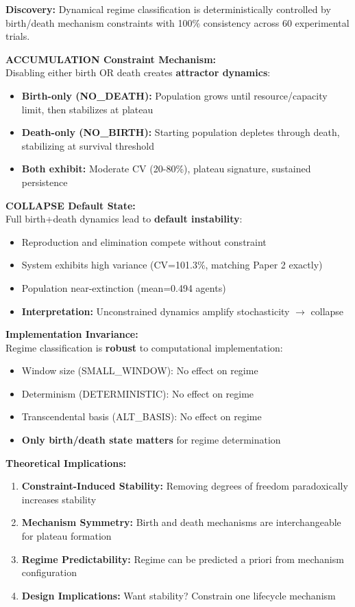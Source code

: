 \documentclass[11pt]{article}
\begin{document}
\textbf{Discovery:} Dynamical regime classification is deterministically controlled by birth/death mechanism constraints with 100\% consistency across 60 experimental trials.

\textbf{ACCUMULATION Constraint Mechanism:}\\
Disabling either birth OR death creates \textbf{attractor dynamics}:
\begin{itemize}
\item \textbf{Birth-only (NO\_DEATH):} Population grows until resource/capacity limit, then stabilizes at plateau
\item \textbf{Death-only (NO\_BIRTH):} Starting population depletes through death, stabilizing at survival threshold
\item \textbf{Both exhibit:} Moderate CV (20-80\%), plateau signature, sustained persistence
\end{itemize}

\textbf{COLLAPSE Default State:}\\
Full birth+death dynamics lead to \textbf{default instability}:
\begin{itemize}
\item Reproduction and elimination compete without constraint
\item System exhibits high variance (CV=101.3\%, matching Paper 2 exactly)
\item Population near-extinction (mean=0.494 agents)
\item \textbf{Interpretation:} Unconstrained dynamics amplify stochasticity $\rightarrow$ collapse
\end{itemize}

\textbf{Implementation Invariance:}\\
Regime classification is \textbf{robust} to computational implementation:
\begin{itemize}
\item Window size (SMALL\_WINDOW): No effect on regime
\item Determinism (DETERMINISTIC): No effect on regime
\item Transcendental basis (ALT\_BASIS): No effect on regime
\item \textbf{Only birth/death state matters} for regime determination
\end{itemize}

\textbf{Theoretical Implications:}
\begin{enumerate}
\item \textbf{Constraint-Induced Stability:} Removing degrees of freedom paradoxically increases stability
\item \textbf{Mechanism Symmetry:} Birth and death mechanisms are interchangeable for plateau formation
\item \textbf{Regime Predictability:} Regime can be predicted a priori from mechanism configuration
\item \textbf{Design Implications:} Want stability? Constrain one lifecycle mechanism
\end{enumerate}
\end{document}

